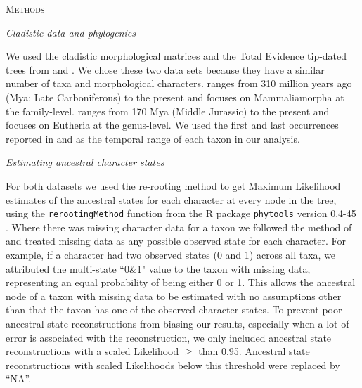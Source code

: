 \documentclass[12pt,letterpaper]{article}
\renewcommand{\section}[1]{%
\bigskip
\begin{center}
\begin{Large}
\normalfont\scshape #1
\medskip
\end{Large}
\end{center}}
\renewcommand{\subsection}[1]{%
\bigskip
\begin{center}
\begin{large}
\normalfont\itshape #1
\end{large}
\end{center}}
\begin{document}
%
%

\section{Methods}

\subsection{Cladistic data and phylogenies}
We used the cladistic morphological matrices and the Total Evidence tip-dated trees \citep{ronquista2012} from \citet[][103 taxa and 446 morphological characters]{Slater2012MEE} and \citet[][102 taxa and 421 morphological characters]{beckancient2014}.
We chose these two data sets because they have a similar number of taxa and morphological characters.
\cite{Slater2012MEE} ranges from 310 million years ago (Mya; Late Carboniferous) to the present and focuses on Mammaliamorpha at the family-level.
\cite{beckancient2014} ranges from 170 Mya (Middle Jurassic) to the present and focuses on Eutheria at the genus-level.
We used the first and last occurrences reported in \cite{Slater2012MEE} and \cite{beckancient2014} as the temporal range of each taxon in our analysis.

\subsection{Estimating ancestral character states}
For both datasets we used the re-rooting method \citep{Yang01121995,Garland2000} to get Maximum Likelihood estimates of the ancestral states for each character at every node in the tree, using the \texttt{rerootingMethod} function from the R package \texttt{phytools} version 0.4-45 \citep{phytools,R}.
Where there was missing character data for a taxon we followed the method of \cite{Claddis} and treated  missing data as any possible observed state for each character.
For example, if a character had two observed states (0 and 1) across all taxa, we attributed the multi-state ``0\&1" value to the taxon with missing data, representing an equal probability of being either 0 or 1.
This allows the ancestral node of a taxon with missing data to be estimated with no assumptions other than that the taxon has one of the observed character states.
To prevent poor ancestral state reconstructions from biasing our results, especially when a lot of error is associated with the reconstruction, we only included ancestral state reconstructions with a scaled Likelihood $\geq$ than 0.95.
Ancestral state reconstructions with scaled Likelihoods below this threshold were replaced by ``NA''.
\end{document}
